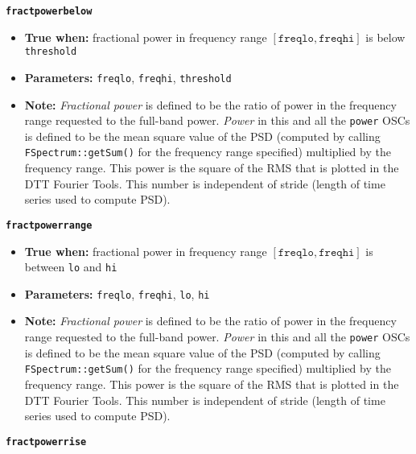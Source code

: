 {{\large\texttt{\textbf{fractpowerbelow}}}

\begin{itemize}
\item \textbf{True when:} fractional power in frequency range
  $[\mathtt{freqlo}, \mathtt{freqhi}]$ is below \texttt{threshold}
\item \textbf{Parameters:} \texttt{freqlo}, \texttt{freqhi}, \texttt{threshold}
\item \textbf{Note:} \textit{Fractional power} is defined to be the
  ratio of power in the frequency range requested to the full-band
  power.  \textit{Power} in this and all the \texttt{power}
  OSCs is defined to be the mean square value of the PSD
  (computed by calling \texttt{FSpectrum::getSum()} for the
  frequency range specified) multiplied by the frequency range. This
  power is the square of the RMS that is plotted in the DTT Fourier
  Tools. This number is independent of stride (length of time series
  used to compute PSD). 
\end{itemize}


{\large\texttt{\textbf{fractpowerrange}}}

\begin{itemize}
\item \textbf{True when:} fractional power in frequency range
  $[\mathtt{freqlo}, \mathtt{freqhi}]$ is between \texttt{lo} and \texttt{hi}
\item \textbf{Parameters:} \texttt{freqlo}, \texttt{freqhi},
  \texttt{lo}, \texttt{hi} 
\item \textbf{Note:} \textit{Fractional power} is defined to be the
  ratio of power in the frequency range requested to the full-band
  power.  \textit{Power} in this and all the \texttt{power}
  OSCs is defined to be the mean square value of the PSD
  (computed by calling \texttt{FSpectrum::getSum()} for the
  frequency range specified) multiplied by the frequency range. This
  power is the square of the RMS that is plotted in the DTT Fourier
  Tools.  This number is independent of stride (length of time series
  used to compute PSD). 
\end{itemize}

{\large\texttt{\textbf{fractpowerrise}}}

}
